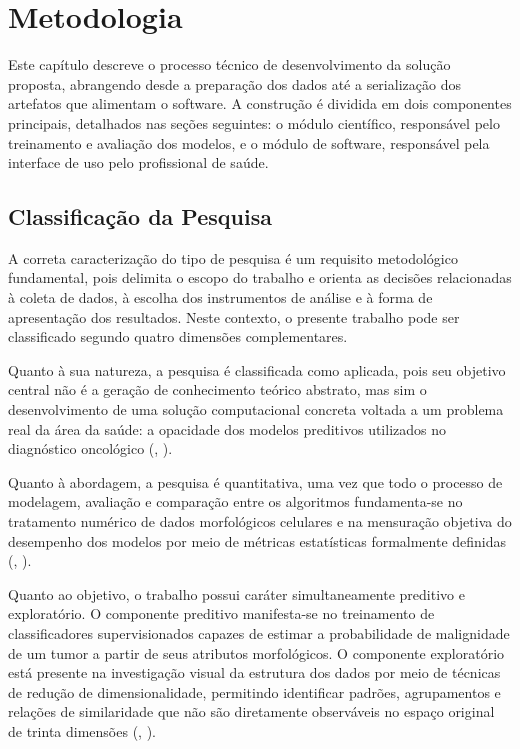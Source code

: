 \documentclass[
    12pt
    ,oneside
    ,a4paper
    ,chapter=TITLE
    ,section=TITLE
    ,sumario=abnt-6027-2012
    ,english,brazil]{abntex2} %
\begin{document}
\chapter{Metodologia}
\label{cap:metodologia}

Este capítulo descreve o processo técnico de desenvolvimento da solução proposta,
abrangendo desde a preparação dos dados até a serialização dos artefatos que
alimentam o software. A construção é dividida em dois componentes principais,
detalhados nas seções seguintes: o módulo científico, responsável pelo treinamento
e avaliação dos modelos, e o módulo de software, responsável pela interface de
uso pelo profissional de saúde.

\section{Classificação da Pesquisa}
\label{sec:classificacao-pesquisa}

A correta caracterização do tipo de pesquisa é um requisito metodológico
fundamental, pois delimita o escopo do trabalho e orienta as decisões
relacionadas à coleta de dados, à escolha dos instrumentos de análise e à
forma de apresentação dos resultados. Neste contexto, o presente trabalho pode ser classificado
segundo quatro dimensões complementares.

Quanto à sua natureza, a pesquisa é classificada como aplicada, pois seu
objetivo central não é a geração de conhecimento teórico abstrato, mas sim o
desenvolvimento de uma solução computacional concreta voltada a um problema real
da área da saúde: a opacidade dos modelos preditivos utilizados no diagnóstico
oncológico (, \citeyear{Gil2002}).

Quanto à abordagem, a pesquisa é quantitativa, uma vez que todo o processo de
modelagem, avaliação e comparação entre os algoritmos fundamenta-se no
tratamento numérico de dados morfológicos celulares e na mensuração objetiva do
desempenho dos modelos por meio de métricas estatísticas formalmente definidas
(, \citeyear{Faceli2011}).

Quanto ao objetivo, o trabalho possui caráter simultaneamente preditivo e
exploratório. O componente preditivo manifesta-se no treinamento de
classificadores supervisionados capazes de estimar a probabilidade de
malignidade de um tumor a partir de seus atributos morfológicos. O componente
exploratório está presente na investigação visual da estrutura dos dados por
meio de técnicas de redução de dimensionalidade, permitindo identificar padrões,
agrupamentos e relações de similaridade que não são diretamente observáveis no
espaço original de trinta dimensões (,
\citeyear{Cruz2006}).
\end{document}
